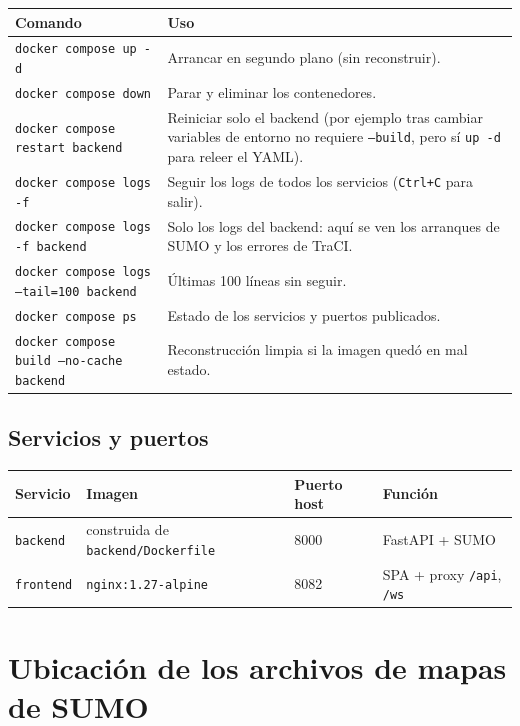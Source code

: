 \documentclass[11pt,a4paper]{article}
\begin{document}
\begin{longtable}{@{}p{6.4cm}p{8.3cm}@{}}
\toprule
\textbf{Comando} & \textbf{Uso} \\
\midrule
\texttt{docker compose up -d} & Arrancar en segundo plano (sin reconstruir). \\
\texttt{docker compose down} & Parar y eliminar los contenedores. \\
\texttt{docker compose restart backend} & Reiniciar solo el backend (por ejemplo
  tras cambiar variables de entorno no requiere \texttt{--build}, pero sí
  \texttt{up -d} para releer el YAML). \\
\texttt{docker compose logs -f} & Seguir los logs de todos los servicios
  (\texttt{Ctrl+C} para salir). \\
\texttt{docker compose logs -f backend} & Solo los logs del backend: aquí se ven
  los arranques de SUMO y los errores de TraCI. \\
\texttt{docker compose logs --tail=100 backend} & Últimas 100 líneas sin seguir. \\
\texttt{docker compose ps} & Estado de los servicios y puertos publicados. \\
\texttt{docker compose build --no-cache backend} & Reconstrucción limpia si la
  imagen quedó en mal estado. \\
\bottomrule
\end{longtable}

\subsection{Servicios y puertos}

\begin{longtable}{@{}llll@{}}
\toprule
\textbf{Servicio} & \textbf{Imagen} & \textbf{Puerto host} & \textbf{Función} \\
\midrule
\texttt{backend}  & construida de \texttt{backend/Dockerfile} & 8000 & FastAPI + SUMO \\
\texttt{frontend} & \texttt{nginx:1.27-alpine} & 8082 & SPA + proxy \texttt{/api}, \texttt{/ws} \\
\bottomrule
\end{longtable}

\section{Ubicación de los archivos de mapas de SUMO}
\end{document}
